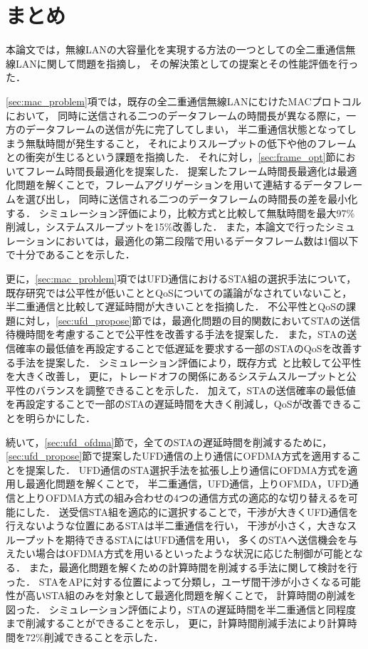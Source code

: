 \documentclass[master]{kuisthesis}		%
\begin{document}
\section{まとめ}
	本論文では，無線LANの大容量化を実現する方法の一つとしての全二重通信無線LANに関して問題を指摘し，
	その解決策としての提案とその性能評価を行った．
	\par
	\ref{sec:mac_problem}項では，既存の全二重通信無線LANにむけたMACプロトコルにおいて，
	同時に送信される二つのデータフレームの時間長が異なる際に，一方のデータフレームの送信が先に完了してしまい，
	半二重通信状態となってしまう無駄時間が発生すること，
	それによりスループットの低下や他のフレームとの衝突が生じるという課題を指摘した．
	それに対し，\ref{sec:frame_opt}節においてフレーム時間長最適化を提案した．
	提案したフレーム時間長最適化は最適化問題を解くことで，フレームアグリゲーションを用いて連結するデータフレームを選び出し，
	同時に送信される二つのデータフレームの時間長の差を最小化する．
	シミュレーション評価により，比較方式と比較して無駄時間を最大97\%削減し，システムスループットを15\%改善した．
	また，本論文で行ったシミュレーションにおいては，最適化の第二段階で用いるデータフレーム数は1個以下で十分であることを示した．
	\par
	更に，\ref{sec:mac_problem}項ではUFD通信におけるSTA組の選択手法について，
	既存研究では公平性が低いこととQoSについての議論がなされていないこと，
	半二重通信と比較して遅延時間が大きいことを指摘した．
	不公平性とQoSの課題に対し，\ref{sec:ufd_propose}節では，最適化問題の目的関数においてSTAの送信待機時間を考慮することで公平性を改善する手法を提案した．
	また，STAの送信確率の最低値を再設定することで低遅延を要求する一部のSTAのQoSを改善する手法を提案した．
	シミュレーション評価により，既存方式~\cite{promac}と比較して公平性を大きく改善し，
	更に，トレードオフの関係にあるシステムスループットと公平性のバランスを調整できることを示した．
	加えて，STAの送信確率の最低値を再設定することで一部のSTAの遅延時間を大きく削減し，QoSが改善できることを明らかにした．
	\par
	続いて，\ref{sec:ufd_ofdma}節で，全てのSTAの遅延時間を削減するために，
	\ref{sec:ufd_propose}節で提案したUFD通信の上り通信にOFDMA方式を適用することを提案した．
	UFD通信のSTA選択手法を拡張し上り通信にOFDMA方式を適用し最適化問題を解くことで，
	半二重通信，UFD通信，上りOFMDA，UFD通信と上りOFDMA方式の組み合わせの4つの通信方式の適応的な切り替えるを可能にした．
	送受信STA組を適応的に選択することで，干渉が大きくUFD通信を行えないような位置にあるSTAは半二重通信を行い，
	干渉が小さく，大きなスループットを期待できるSTAにはUFD通信を用い，
	多くのSTAへ送信機会を与えたい場合はOFDMA方式を用いるといったような状況に応じた制御が可能となる．
	また，最適化問題を解くための計算時間を削減する手法に関して検討を行った．
	STAをAPに対する位置によって分類し，ユーザ間干渉が小さくなる可能性が高いSTA組のみを対象として最適化問題を解くことで，
	計算時間の削減を図った．
	シミュレーション評価により，STAの遅延時間を半二重通信と同程度まで削減することができることを示し，
	更に，計算時間削減手法により計算時間を72\%削減できることを示した．
\end{document}
